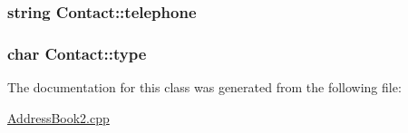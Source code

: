 \subsubsection[{\texorpdfstring{telephone}{telephone}}]{\setlength{\rightskip}{0pt plus 5cm}string Contact\+::telephone\hspace{0.3cm}{\ttfamily [protected]}}\hypertarget{classContact_ad23a96ecf0527e8878da50da682ba794}{}\label{classContact_ad23a96ecf0527e8878da50da682ba794}
\subsubsection[{\texorpdfstring{type}{type}}]{\setlength{\rightskip}{0pt plus 5cm}char Contact\+::type\hspace{0.3cm}{\ttfamily [protected]}}\hypertarget{classContact_ad76971e3edec9fdbc665d149cfbd9e1a}{}\label{classContact_ad76971e3edec9fdbc665d149cfbd9e1a}


The documentation for this class was generated from the following file\+:\begin{DoxyCompactItemize}
\item 
\hyperlink{AddressBook2_8cpp}{Address\+Book2.\+cpp}\end{DoxyCompactItemize}
